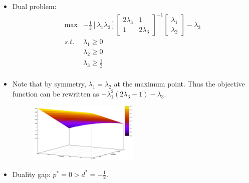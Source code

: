 \documentclass[mathserif]{beamer}
\begin{document}
{\begin{itemize}
\[\begin{array}{lllll}
\begin{cases}
	 \end{cases} 
\end{array}
\]		
(This can be easily derived through setting the gradient $\frac{\partial L}{\partial x_i}=0$ in the case of $\lambda_3 >  \tfrac{1}{2}  $)

	\item Dual problem: 
\[
\begin{array}{rlllll}
 \max &  - \tfrac{1}{2} \left[\lambda_1 \lambda_2 \right] \left[ \begin{matrix}  2\lambda_3 & 1 \\ 1 & 2\lambda_3 \end{matrix} \right]^{-1}  \left[ \begin{matrix} \lambda_1 \\ \lambda_2 \end{matrix}\right]   -\lambda_3   \\
s.t. 	& \lambda_1   \geq  0  \\
 	& \lambda_2  \geq  0  \\
  & \lambda_3  \geq   \tfrac{1}{2}   \\
 \end{array} \nonumber
\]	
\item Note that by symmetry, $\lambda_1 = \lambda_2$ at the maximum point. Thus the objective function can be rewritten as $ - \lambda_1^2 (2\lambda_3 - 1)  -\lambda_3$. 

\begin{figure}
       \includegraphics[width=0.5\textwidth]{L9-Duality-Gap-Example-g-lambda.png}%
\end{figure}

	\item Duality gap: $p^* = 0 > d^* = -\tfrac{1}{2}$. 
\end{itemize}
	
}

\end{document}
